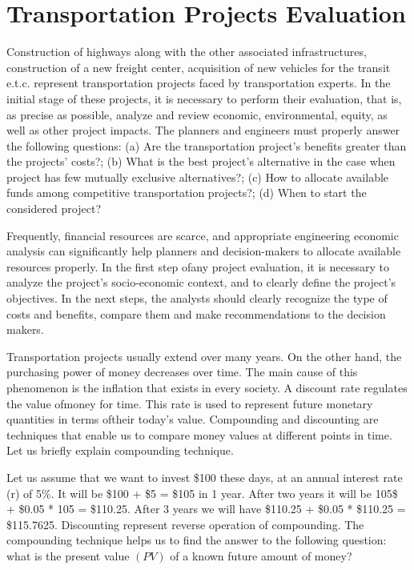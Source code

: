 \section{Transportation Projects Evaluation}
Construction of highways along with the other associated infrastructures, construction of a new freight center, acquisition of new vehicles for the transit e.t.c. represent transportation projects faced by transportation experts. In the initial stage of these projects, it is necessary to perform their evaluation, that is, as precise as possible, analyze and review economic, environmental, equity, as well as other project impacts. The planners and engineers must properly answer the following questions: (a) Are the transportation project’s benefits greater than the projects’ costs?; (b) What is the best project’s alternative in the case when project has few mutually exclusive alternatives?; (c) How to allocate available funds among competitive transportation projects?; (d) When to start the considered project?\\
\par
Frequently, financial resources are scarce, and appropriate engineering economic analysis can significantly help planners and decision-makers to allocate available resources properly. In the first step ofany project evaluation, it is necessary to analyze the project’s socio-economic context, and to clearly define the project’s objectives. In the next steps, the analysts should clearly recognize the type of costs and benefits, compare them and make recommendations to the decision makers.\\
\par
Transportation projects usually extend over many years. On the other hand, the purchasing power of money decreases over time. The main cause of this phenomenon is the inflation that exists in every society. A discount rate regulates the value ofmoney for time. This rate is used to represent future monetary quantities in terms oftheir today’s value. Compounding and discounting are techniques that enable us to compare money values at different points in time. Let us briefly explain compounding technique.\\
\par
Let us assume that we want to invest \$100 these days, at an annual interest rate (r) of 5\%. It will be \$100 + \$5 = \$105 in 1 year. After two years it will be 105\$ + \$0.05 * 105 = \$110.25. After 3 years we will have \$110.25 + \$0.05 * \$110.25 = \$115.7625. Discounting represent reverse operation of compounding. The compounding technique helps us to find the answer to the following question: what is the present value $(PV)$ of a known future amount of money?\\
